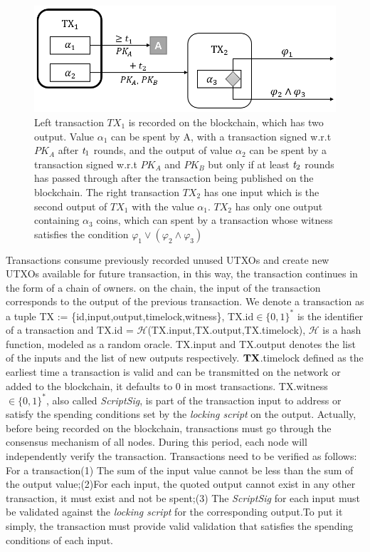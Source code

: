 \documentclass[conference]{IEEEtran}
\begin{document}
\begin{figure}[t]
	\centering
	\includegraphics[scale=0.5]{fig2.png}
	\caption{Left transaction $TX_1$ is recorded on the blockchain, which has two output. Value $\alpha_1$ can be spent 
	by A, with a transaction signed w.r.t $PK_A$ after $\emph{t}_1$ rounds, and the output of value $\alpha_2$ can 
	be spent by a transaction signed w.r.t $PK_A$ and $PK_B$ but only if at least $\emph{t}_2$ rounds has passed 
	through after the transaction being published on the blockchain. The right transaction $TX_2$ has one input 
	which is the second output of $TX_1$ with the value $\alpha_1$. $TX_2$ has only one output containing $\alpha_3$ 
	coins, which can spent by a transaction whose witness satisfies the condition $\varphi_1 \vee (\varphi_2 \wedge \varphi_3)$}
\end{figure}

Transactions consume previously recorded unused UTXOs and create new UTXOs available for future transaction, in this 
way, the transaction continues in the form of a chain of owners. on the chain, the input of the transaction corresponds 
to the output of the previous transaction. We denote a transaction as a tuple TX := \{id,input,output,timelock,witness\}, 
TX.id$\in\{0,1\}^*$ is the identifier of a transaction and TX.id = $\mathcal H$(TX.input,TX.output,TX.timelock), $\mathcal H$ 
is a hash function, modeled as a random oracle. TX.input and TX.output denotes the list of the inputs and the list of 
new outputs respectively. $\bf TX$.timelock defined as the earliest time a transaction is valid and can be transmitted 
on the network or added to the blockchain, it defaults to 0 in most transactions. TX.witness$\in\{0,1\}^*$, also 
called \emph{ScriptSig}, is part of the transaction input to address or satisfy the spending conditions set by the 
\emph{locking script} on the output. Actually, before being recorded on the blockchain, transactions must go through 
the consensus mechanism of all nodes. During this period, each node will independently verify the transaction. 
Transactions need to be verified as follows: For a transaction(1) The sum of the input value cannot be less 
than the sum of the output value;(2)For each input, the quoted output cannot exist in any other transaction, 
it must exist and not be spent;(3) The \emph{ScriptSig} for each input must be validated against the \emph{locking script} 
for the corresponding output.To put it simply, the transaction must provide valid validation that satisfies the spending 
conditions of each input.
\end{document}
